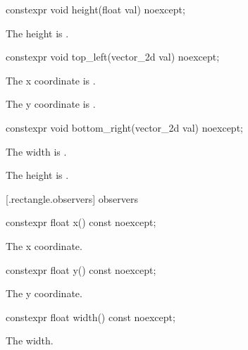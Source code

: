 %
\begin{itemdecl}
constexpr void height(float val) noexcept;
\end{itemdecl}
\begin{itemdescr}
\pnum
\effects
The height is .
\end{itemdescr}

%
\begin{itemdecl}
constexpr void top_left(vector_2d val) noexcept;
\end{itemdecl}
\begin{itemdescr}
\pnum
\effects
The x coordinate is .

\effects
The y coordinate is .
\end{itemdescr}

%
\begin{itemdecl}
constexpr void bottom_right(vector_2d val) noexcept;
\end{itemdecl}
\begin{itemdescr}
\pnum
\effects
The width is .

\pnum
The height is .
\end{itemdescr}

 [\iotwod.rectangle.observers]{ observers}

%
\begin{itemdecl}
constexpr float x() const noexcept;
\end{itemdecl}
\begin{itemdescr}
\pnum
\returns
The x coordinate.
\end{itemdescr}

%
\begin{itemdecl}
constexpr float y() const noexcept;
\end{itemdecl}
\begin{itemdescr}
\pnum
\returns
The y coordinate.
\end{itemdescr}

%
\begin{itemdecl}
constexpr float width() const noexcept;
\end{itemdecl}
\begin{itemdescr}
\pnum
\returns
The width.
\end{itemdescr}

